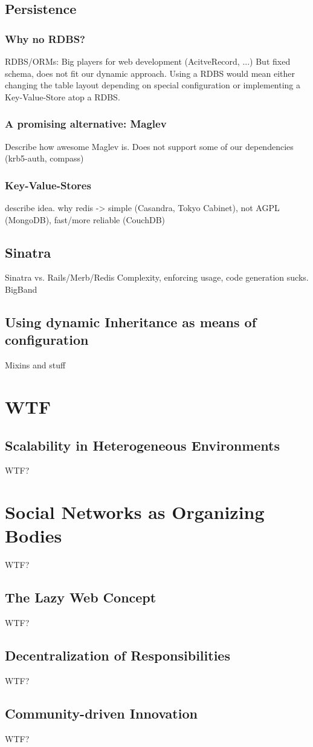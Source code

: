 \documentclass{llncs}
\begin{document}
\subsection{Persistence}
\subsubsection{Why no RDBS?}
RDBS/ORMs: Big players for web development (AcitveRecord, ...)
But fixed schema, does not fit our dynamic approach.
Using a RDBS would mean either changing the table layout depending on special configuration or implementing a Key-Value-Store atop a RDBS.

\subsubsection{A promising alternative: Maglev}
Describe how awesome Maglev is.
Does not support some of our dependencies (krb5-auth, compass)

\subsubsection{Key-Value-Stores}
describe idea.
why redis -> simple (Casandra, Tokyo Cabinet), not AGPL (MongoDB), fast/more reliable (CouchDB)

\subsection{Sinatra}
Sinatra vs. Rails/Merb/Redis
Complexity, enforcing usage, code generation sucks.
BigBand

\subsection{Using dynamic Inheritance as means of configuration}
Mixins and stuff

\section{WTF}

\subsection{Scalability in Heterogeneous Environments}
WTF?

\section{Social Networks as Organizing Bodies}
WTF?

\subsection{The Lazy Web Concept}
WTF?

\subsection{Decentralization of Responsibilities}
WTF?

\subsection{Community-driven Innovation}
WTF?
\end{document}
